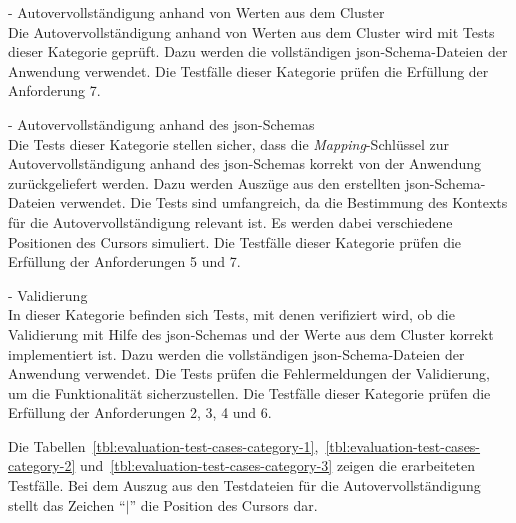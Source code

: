 \begin{description}
    \setlength\itemsep{-0.5cm}
    \item[Kategorie 1]{- Autovervollständigung anhand von Werten aus dem Cluster\\}
          Die Autovervollständigung anhand von Werten aus dem Cluster wird mit Tests dieser Kategorie geprüft.
          Dazu werden die vollständigen \ac{json}-Schema-Dateien der Anwendung verwendet.
          Die Testfälle dieser Kategorie prüfen die Erfüllung der Anforderung 7.
    \item[Kategorie 2]{- Autovervollständigung anhand des \ac{json}-Schemas\\}
          Die Tests dieser Kategorie stellen sicher,
          dass die \textit{Mapping}-Schlüssel zur Autovervollständigung anhand des \ac{json}-Schemas korrekt von der Anwendung zurückgeliefert werden.
          Dazu werden Auszüge aus den erstellten \ac{json}-Schema-Dateien verwendet. Die Tests sind umfangreich,
          da die Bestimmung des Kontexts für die Autovervollständigung relevant ist. Es werden dabei verschiedene Positionen des Cursors simuliert.
          Die Testfälle dieser Kategorie prüfen die Erfüllung der Anforderungen 5 und 7.
    \item[Kategorie 3]{- Validierung\\}
          In dieser Kategorie befinden sich Tests, mit denen verifiziert wird, ob die Validierung mit Hilfe des \ac{json}-Schemas
          und der Werte aus dem Cluster korrekt implementiert ist. Dazu werden die vollständigen \ac{json}-Schema-Dateien der Anwendung verwendet.
          Die Tests prüfen die Fehlermeldungen der Validierung, um die Funktionalität sicherzustellen.
          Die Testfälle dieser Kategorie prüfen die Erfüllung der Anforderungen 2, 3, 4 und 6.


\end{description}

Die Tabellen~\ref{tbl:evaluation-test-cases-category-1},~\ref{tbl:evaluation-test-cases-category-2} und~\ref{tbl:evaluation-test-cases-category-3}  zeigen die erarbeiteten Testfälle.
Bei dem Auszug aus den Testdateien für die Autovervollständigung stellt das Zeichen ``$|$'' die Position des Cursors dar.


